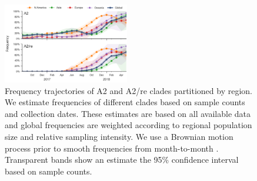 \begin{figure}[b]
    \begin{center}
    \includegraphics[width=0.49\textwidth]{figures/h3n2_freq_mutations.png}
    \end{center}
    \caption{Frequency trajectories of A2 and A2/re clades partitioned by region. We estimate frequencies of different clades based on sample counts and collection dates. These estimates are based on all available data and global frequencies are weighted according to regional population size and relative sampling intensity. We use a Brownian motion process prior to smooth frequencies from month-to-month \citep{neher_nextflu_2015}. Transparent bands show an estimate the 95\% confidence interval based on sample counts.}
    \label{fig:frequencies}
\end{figure}

